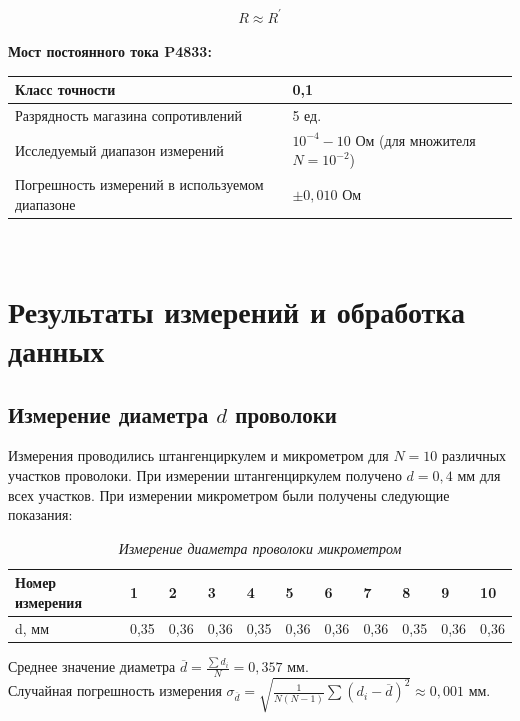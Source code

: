 \documentclass[a4paper,12pt]{article} %
\begin{document}
\begin{equation}
R\approx R^\prime
\end{equation}\\

\noindent\textbf{Мост постоянного тока P4833:}\\
\begin{tabular}{|p{8cm}|p{7cm}|}
	\hline
	Класс точности&0,1 \\
	\hline
	Разрядность магазина сопротивлений& 5 ед. \\
	\hline
	Исследуемый диапазон измерений& $ 10^{-4} - 10 \text{ Ом} $ (для множителя $ N = 10^{-2} $) \\
	\hline
	Погрешность измерений в используемом диапазоне& $\pm0,010\text{ Ом}$ \\
	\hline
\end{tabular}\\

\section{Результаты измерений и обработка данных}

\subsection{Измерение диаметра $d$ проволоки}

Измерения проводились штангенциркулем и микрометром для $N = 10$ различных участков проволоки. При измерении штангенциркулем получено $d = 0,4$ мм для всех участков. При измерении микрометром были получены следующие показания:

\begin{table}[h]
	\begin{tabular}{|l|l|l|l|l|l|l|l|l|l|l|}
		\hline
		Номер   измерения & 1    & 2    & 3    & 4    & 5    & 6    & 7    & 8    & 9    & 10   \\ \hline
		d, мм             & 0,35 & 0,36 & 0,36 & 0,35 & 0,36 & 0,36 & 0,36 & 0,35 & 0,36 & 0,36 \\ \hline
	\end{tabular}\caption{\textit{Измерение диаметра проволоки микрометром}}
\end{table}

Среднее значение диаметра $ \overline{d} = \frac{\sum d_i}{N} = 0,357 \text{ мм}$.\\

Случайная погрешность измерения $ \sigma_{\overline{d}} = \sqrt{\frac{1}{N  (N-1)}\sum(d_i-\overline{d})^2} \approx 0,001 \text{ мм}$.\\
\end{document}
